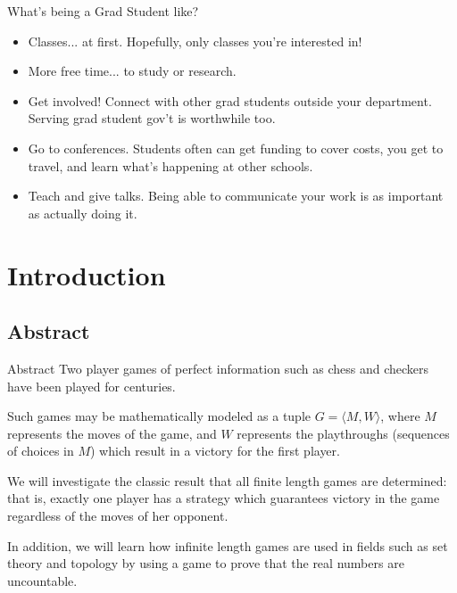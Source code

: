 \documentclass{beamer}
\theoremstyle{theorem}
\theoremstyle{definition}
\newcommand{\<}{\langle}
\renewcommand{\>}{\rangle}
\newcommand{\vpause}{\pause\vspace{1em}}
\begin{document}
\begin{frame}{What's being a Grad Student like?}
  \begin{itemize}
    \item Classes... at first. Hopefully, only classes you're interested in!
    \pause
    \item More free time... to study or research.
    \pause
    \item Get involved! Connect with other grad students outside your
          department. Serving grad student gov't is worthwhile too.
    \pause
    \item Go to conferences. Students often can get funding to cover costs,
          you get to travel, and learn what's happening at other schools.
    \pause
    \item Teach and give talks. Being able to communicate your work is as
          important as actually doing it.
  \end{itemize}
\end{frame}


\section{Introduction}

\subsection{Abstract}

\begin{frame}{Abstract}%
    \small
    Two player games of perfect information such as chess and checkers have
    been played for centuries.

    \vpause

    Such games may be mathematically modeled as a tuple $G=\<M,W\>$, where $M$
    represents the moves of the game, and $W$ represents the playthroughs
    (sequences of choices in $M$) which result in a victory for the first
    player.

    \vpause

    We will investigate the classic result that all finite length games are
    determined: that is, exactly one player has a strategy which guarantees
    victory in the game regardless of the moves of her opponent.

    \vpause

    In addition, we will learn how infinite length games are used in fields
    such as set theory and topology by using a game to prove that the real
    numbers are uncountable.
\end{frame}
\end{document}

